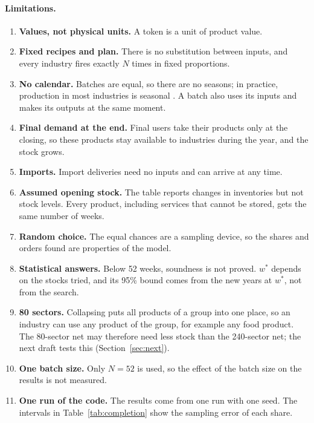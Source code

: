 \documentclass[11pt]{article}
\begin{document}
\paragraph{Limitations.}
\begin{enumerate}[label=(\roman*),leftmargin=*]
\item \textbf{Values, not physical units.} A token is a unit of product value.
\item \textbf{Fixed recipes and plan.} There is no substitution between inputs, and every industry fires exactly $N$ times in fixed proportions.
\item \textbf{No calendar.} Batches are equal, so there are no seasons; in practice, production in most industries is seasonal \citep{MironZeldes1988}. A batch also uses its inputs and makes its outputs at the same moment.
\item \textbf{Final demand at the end.} Final users take their products only at the closing, so these products stay available to industries during the year, and the stock grows.
\item \textbf{Imports.} Import deliveries need no inputs and can arrive at any time.
\item \textbf{Assumed opening stock.} The table reports changes in inventories but not stock levels. Every product, including services that cannot be stored, gets the same number of weeks.
\item \textbf{Random choice.} The equal chances are a sampling device, so the shares and orders found are properties of the model.
\item \textbf{Statistical answers.} Below 52 weeks, soundness is not proved. $w^*$ depends on the stocks tried, and its 95\% bound comes from the new years at $w^*$, not from the search.
\item \textbf{80 sectors.} Collapsing puts all products of a group into one place, so an industry can use any product of the group, for example any food product. The 80-sector net may therefore need less stock than the 240-sector net; the next draft tests this (Section~\ref{sec:next}).
\item \textbf{One batch size.} Only $N=52$ is used, so the effect of the batch size on the results is not measured.
\item \textbf{One run of the code.} The results come from one run with one seed. The intervals in Table~\ref{tab:completion} show the sampling error of each share.
\end{enumerate}

\end{document}
